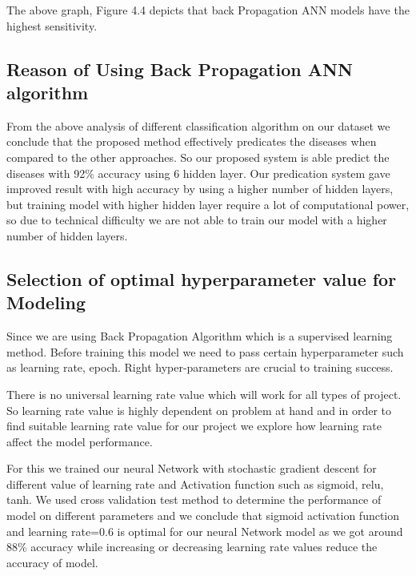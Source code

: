 The  above  graph, Figure 4.4 depicts that back Propagation ANN  models  have the highest sensitivity.\newline

\subsection{Reason of Using Back Propagation ANN algorithm}

 From the above analysis of different classification algorithm on our dataset we conclude  that the proposed method effectively predicates the diseases when compared to the other approaches. So our proposed system is able predict the diseases with 92\% accuracy using 6 hidden layer. Our predication system gave improved result with high accuracy by using a higher number of hidden layers, but training model with higher hidden layer require a lot of computational power, so due to technical difficulty we are not able to train our model with a higher number of hidden layers.

\subsection{Selection of optimal  hyperparameter value for Modeling}

Since we are using Back Propagation Algorithm which is a supervised learning method. Before training this model we need to pass certain hyperparameter such as learning rate, epoch. Right hyper-parameters are crucial to training success.

There is no universal learning rate value which will work for all types of project. So learning rate value is highly dependent on problem at hand and in order to find suitable learning rate value for our project we explore how learning rate affect the model performance.

For this we trained our neural Network with stochastic gradient descent for different value of learning rate and Activation function such as sigmoid, relu, tanh. We used cross validation test method to determine the performance of model on different parameters and  we conclude that sigmoid activation function and learning rate=0.6 is optimal for our neural Network model as we got around 88\%  accuracy while increasing or decreasing learning rate values reduce the accuracy of model.

